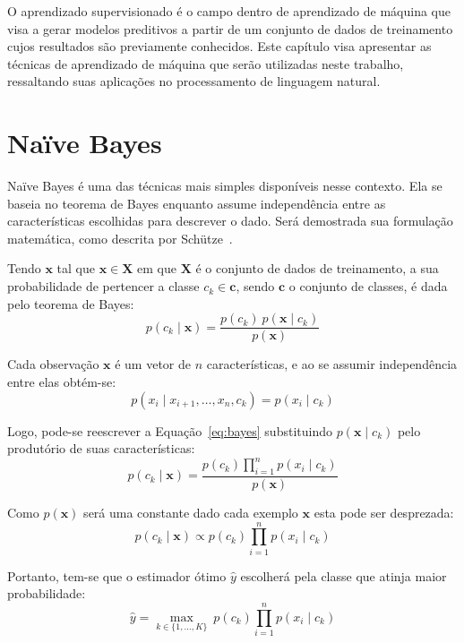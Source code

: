 O aprendizado supervisionado é o campo dentro de aprendizado de máquina que visa a gerar modelos preditivos a partir de
um conjunto de dados de treinamento cujos resultados são previamente conhecidos.
Este capítulo visa apresentar as técnicas de aprendizado de máquina que serão utilizadas neste trabalho, ressaltando
suas aplicações no processamento de linguagem natural.

\section{Naïve Bayes} \label{sec:bayes}

Naïve Bayes é uma das técnicas mais simples disponíveis nesse contexto.
Ela se baseia no teorema de Bayes enquanto assume independência entre as características escolhidas para descrever o
dado.
Será demostrada sua formulação matemática, como descrita por Schütze~\cite{schutze08}.

Tendo $\mathbf{x}$ tal que $\mathbf{x} \in \mathbf{X}$ em que $\mathbf{X}$ é o conjunto de dados de treinamento, a sua
probabilidade de pertencer a classe $c_k \in \mathbf{c}$, sendo $\mathbf{c}$ o conjunto de classes, é dada pelo teorema de Bayes:
\begin{equation} \label{eq:bayes}
    p(c_k \mid \mathbf{x}) = \frac{p(c_k) \ p(\mathbf{x} \mid c_k)}{p(\mathbf{x})}
\end{equation}

Cada observação $\mathbf{x}$ é um vetor de $n$ características, e ao se assumir independência entre elas obtém-se:
\begin{equation}
    p(x_i \mid x_{i+1}, \dots ,x_{n}, c_k ) = p(x_i \mid c_k)
\end{equation}

Logo, pode-se reescrever a Equação~\ref{eq:bayes} substituindo $p(\mathbf{x} \mid c_k)$ pelo produtório de suas
características:
\begin{equation}
    p(c_k \mid \mathbf{x}) = \frac{p(c_k) \prod_{i=1}^n p(x_i \mid c_k)}{p(\mathbf{x})}
\end{equation}

Como $p(\mathbf{x})$ será uma constante dado cada exemplo $\mathbf{x}$ esta pode ser desprezada:
\begin{equation}
    p(c_k \mid \mathbf{x}) \propto p(c_k) \prod_{i=1}^n p(x_i \mid c_k)
\end{equation}

Portanto, tem-se que o estimador ótimo $\hat{y}$ escolherá pela classe que atinja maior probabilidade:
\begin{equation}
    \hat{y} = \underset{k \in \{1, \dots, K\}}{\operatorname{max}} \ p(c_k) \displaystyle\prod_{i=1}^n p(x_i \mid c_k)
\end{equation}

